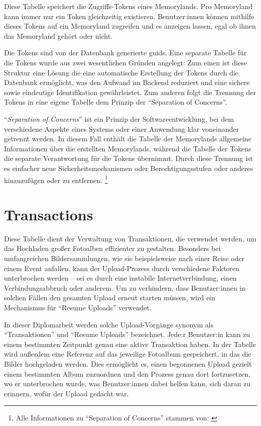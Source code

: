 Diese Tabelle speichert die Zugriffs-Tokens eines Memorylands. Pro Memoryland kann immer nur 
ein Token gleichzeitig existieren. Benutzer:innen können mithilfe dieses Tokens auf ein 
Memoryland zugreifen und es anzeigen lassen, egal ob ihnen das Memoryland gehört oder nicht.

Die Tokens sind von der Datenbank generierte \gls{guid}s. Eine separate Tabelle für die 
Tokens wurde aus zwei wesentlichen Gründen angelegt: Zum einen ist diese Struktur eine Lösung
die eine automatische Erstellung der Tokens durch die Datenbank ermöglicht, was den 
Aufwand im Backend reduziert und eine sichere sowie eindeutige Identifikation gewährleistet. 
Zum anderen folgt die Trennung der Tokens in eine eigene Tabelle dem Prinzip der 
``Separation of Concerns''.

``\emph{Separation of Concerns}'' ist ein Prinzip der Softwareentwicklung, bei dem 
verschiedene Aspekte eines Systems oder einer Anwendung klar voneinander getrennt werden. 
In diesem Fall enthält die Tabelle der Memorylands allgemeine Informationen über die 
erstellten Memorylands, während die Tabelle der Tokens die separate Verantwortung 
für die Tokens übernimmt. Durch diese Trennung ist es einfacher neue Sicherheitsmechanismen 
oder Berechtigungsstufen oder anderes hinzuzufügen oder zu entfernen.
\footnote{Alle Informationen zu ``Separation of Concerns'' stammen von: \cite{kulkarni2003separation}}

\section{Transactions}

Diese Tabelle dient der Verwaltung von Transaktionen, die verwendet werden, um das Hochladen 
großer Fotoalben effizienter zu gestalten. Besonders bei umfangreichen Bildersammlungen, 
wie sie beispielsweise nach einer Reise oder einem Event anfallen, kann der Upload-Prozess 
durch verschiedene Faktoren unterbrochen werden -- sei es durch eine instabile 
Internetverbindung, einen Verbindungsabbruch oder anderem. Um zu verhindern, dass 
Benutzer:innen in solchen Fällen den gesamten Upload erneut starten müssen, wird ein 
Mechanismus für ``Resume Uploads'' verwendet.

In dieser Diplomarbeit werden solche Upload-Vorgänge synonym als ``Transaktionen'' und 
``Resume Uploads'' bezeichnet. Jede:r Benutzer:in kann zu einem bestimmten Zeitpunkt 
genau eine aktive Transaktion haben. In der Tabelle wird außerdem eine Referenz auf 
das jeweilige Fotoalbum gespeichert, in das die Bilder hochgeladen werden. 
Dies ermöglicht es, einen begonnenen Upload gezielt einem bestimmten Album zuzuordnen 
und den Prozess genau dort fortzusetzen, wo er unterbrochen wurde, was Benutzer:innen
dabei helfen kann, sich daran zu erinnern, wofür der Upload gedacht war.


